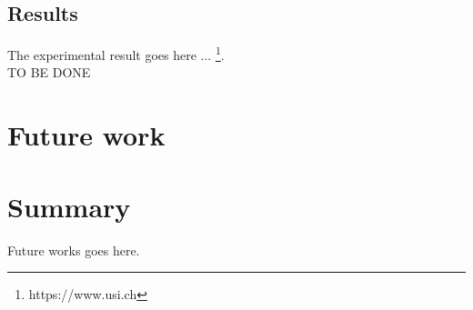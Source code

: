 \documentclass[a4paper]{usiinfbachelorproject}
\begin{document}
	\subsection{\textbf{Results}}
	The experimental result goes here ... \footnote{https://www.usi.ch}. \\
	
 
TO BE DONE




		
\newpage
\section{\textbf{Future work}}

\section{\textbf{Summary}}
Future works goes here.






\newpage
	


\end{document}
